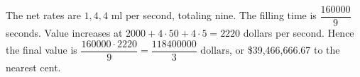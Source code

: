 The net rates are $1,4,4$ ml per second, totaling nine. The filling time is $\dfrac{160000}{9}$ seconds. Value increases at $2000+4\cdot50+4\cdot5=2220$ dollars per second. Hence the final value is $\dfrac{160000\cdot2220}{9}=\boxed{\dfrac{118400000}{3}\text{ dollars}}$, or \$39,466,666.67 to the nearest cent.
